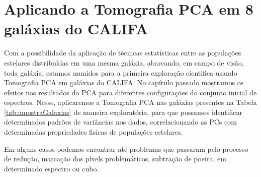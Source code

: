 


\chapter{Aplicando a Tomografia PCA em 8 galáxias do CALIFA}
\label{sec:result}

Com a possibilidade da aplicação de técnicas estatísticas entre as populações estelares distribuídas em uma mesma
galáxia, abarcando, em campo de visão, toda galáxia, estamos munidos para a primeira exploração cientifica usando
Tomografia PCA em galáxias do CALIFA. No capítulo passado mostramos os efeitos nos resultados do PCA para diferentes
configurações do conjunto inicial de espectros. Nesse, aplicaremos a Tomografia PCA nas galáxias presentes na Tabela
\ref{tab:amostraGalaxias} de maneira exploratória, para que possamos identificar determinados padrões de variâncias
nos dados, correlacionando as PCs com determinadas propriedades fisicas de populações estelares.

\ojo Em alguns casos podemos encontrar até problemas que passaram pelo processo de redução, marcação dos píxels
problemáticos, subtração de poeira, em determinado espectro ou cubo.

